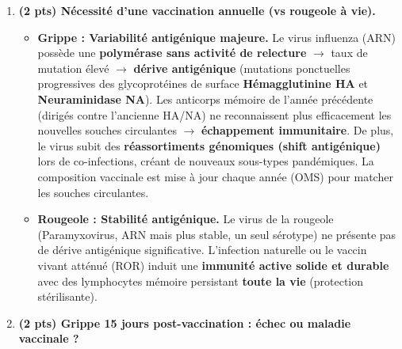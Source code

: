 \documentclass[11pt]{article}
\begin{document}
\begin{corrige}
\begin{enumerate}
\begin{enumerate}
        \item \textbf{Activation et clonage des lymphocytes B :} Parallèlement, des \textbf{lymphocytes B naïfs} spécifiques de l'antigène natif (HA/NA) le capturent via leur \textbf{BCR} (IgM/IgD membranaire), l'internalisent, le traitent et présentent des peptides sur leur \textbf{CMH II}. Les \textbf{Th2 activés} reconnaissent ce complexe, délivrent des signaux co-stimulateurs (CD40L-CD40) et sécrètent des cytokines (IL-4, IL-21). Cela déclenche l'\textbf{activation}, la prolifération intense (\textbf{clonage} / expansion clonale) des LB spécifiques.
        \item \textbf{Différenciation en plasmocytes :} Les LB clonés se \textbf{différencient} majoritairement en \textbf{plasmocytes} (usines à anticorps : sécrétion massive d'IgM puis IgG/IgA spécifiques de l'HA/NA) et en \textbf{lymphocytes B mémoire} (persistance à vie, réponse secondaire rapide).
    \end{enumerate}
    \item \textbf{(2 pts) Nécessité d'une vaccination annuelle (vs rougeole à vie).}
    \begin{itemize}
        \item \textbf{Grippe : Variabilité antigénique majeure.} Le virus influenza (ARN) possède une \textbf{polymérase sans activité de relecture} $\rightarrow$ taux de mutation élevé $\rightarrow$ \textbf{dérive antigénique} (mutations ponctuelles progressives des glycoprotéines de surface \textbf{Hémagglutinine HA} et \textbf{Neuraminidase NA}). Les anticorps mémoire de l'année précédente (dirigés contre l'ancienne HA/NA) ne reconnaissent plus efficacement les nouvelles souches circulantes $\rightarrow$ \textbf{échappement immunitaire}. De plus, le virus subit des \textbf{réassortiments génomiques (shift antigénique)} lors de co-infections, créant de nouveaux sous-types pandémiques. La composition vaccinale est mise à jour chaque année (OMS) pour matcher les souches circulantes.
        \item \textbf{Rougeole : Stabilité antigénique.} Le virus de la rougeole (Paramyxovirus, ARN mais plus stable, un seul sérotype) ne présente pas de dérive antigénique significative. L'infection naturelle ou le vaccin vivant atténué (ROR) induit une \textbf{immunité active solide et durable} avec des lymphocytes mémoire persistant \textbf{toute la vie} (protection stérilisante).
    \end{itemize}
    \item \textbf{(2 pts) Grippe 15 jours post-vaccination : échec ou maladie vaccinale ?}

\end{enumerate}
\end{corrige}
\end{document}
